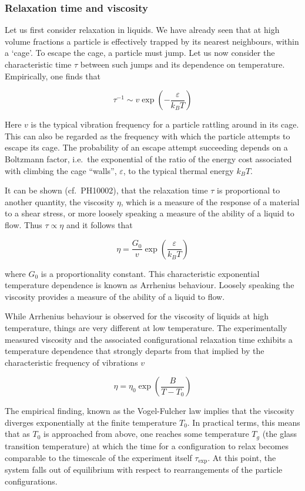 \documentclass[
  letterpaper,
  DIV=11,
  numbers=noendperiod]{scrartcl}
\begin{document}
\subsubsection{Relaxation time and
viscosity}\label{relaxation-time-and-viscosity}

Let us first consider relaxation in liquids. We have already seen that
at high volume fractions a particle is effectively trapped by its
nearest neighbours, within a `cage'. To escape the cage, a particle must
jump. Let us now consider the characteristic time \(\tau\) between such
jumps and its dependence on temperature. Empirically, one finds that

\[
\tau^{-1} \sim v \exp \left(-\frac{\varepsilon}{k_{B} T}\right)
\]

Here \(v\) is the typical vibration frequency for a particle rattling
around in its cage. This can also be regarded as the frequency with
which the particle attempts to escape its cage. The probability of an
escape attempt succeeding depends on a Boltzmann factor, i.e.~the
exponential of the ratio of the energy cost associated with climbing the
cage ``walls'', \(\varepsilon\), to the typical thermal energy
\(k_{B} T\).

It can be shown (cf.~PH10002), that the relaxation time \(\tau\) is
proportional to another quantity, the viscosity \(\eta\), which is a
measure of the response of a material to a shear stress, or more loosely
speaking a measure of the ability of a liquid to flow. Thus
\(\tau \propto \eta\) and it follows that

\[
\eta=\frac{G_{0}}{v} \exp \left(\frac{\varepsilon}{k_{B} T}\right)
\]

where \(G_{0}\) is a proportionality constant. This characteristic
exponential temperature dependence is known as Arrhenius behaviour.
Loosely speaking the viscosity provides a measure of the ability of a
liquid to flow.

While Arrhenius behaviour is observed for the viscosity of liquids at
high temperature, things are very different at low temperature. The
experimentally measured viscosity and the associated configurational
relaxation time exhibits a temperature dependence that strongly departs
from that implied by the characteristic frequency of vibrations \(v\)

\[
\eta=\eta_{0} \exp \left(\frac{B}{T-T_{0}}\right)
\]

The empirical finding, known as the Vogel-Fulcher law implies that the
viscosity diverges exponentially at the finite temperature \(T_{0}\). In
practical terms, this means that as \(T_{0}\) is approached from above,
one reaches some temperature \(T_{g}\) (the glass transition
temperature) at which the time for a configuration to relax becomes
comparable to the timescale of the experiment itself \(\tau_{\exp }\).
At this point, the system falls out of equilibrium with respect to
rearrangements of the particle configurations.
\end{document}
